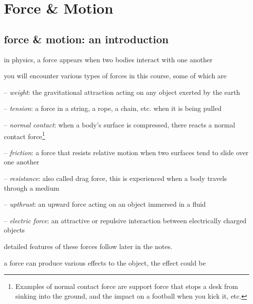 \section{Force \& Motion}

\subsection{force \& motion: an introduction}

in physics, a force appears when two bodies interact with one another

\cmt you will encounter various types of forces in this course, some of which are

\begin{compactitem}
	\item[--] \emph{weight}: the gravitational attraction acting on any object exerted by the earth
	
	\item[--] \emph{tension}: a force in a string, a rope, a chain, etc. when it is being pulled
	
	\item[--] \emph{normal contact}: when a body's surface is compressed, there reacts a normal contact force\footnote{Examples of normal contact force are support force that stops a desk from sinking into the ground, and the impact on a football when you kick it, etc.}
	
	\item[--] \emph{friction}: a force that resists relative motion when two surfaces tend to slide over one another
	
	\item[--] \emph{resistance}: also called drag force, this is experienced when a body travels through a medium

	
	\item[--] \emph{upthrust}: an upward force acting on an object immersed in a fluid
	
	\item[--] \emph{electric force}: an attractive or repulsive interaction between electrically charged objects
	
\end{compactitem}

detailed features of these forces follow later in the notes.

\cmt a force can produce various effects to the object, the effect could be

